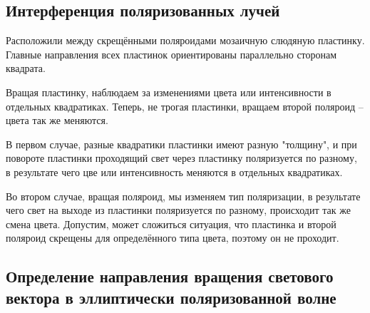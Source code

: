 \documentclass[a4paper,12pt]{article} %
\begin{document}
\subsection{Интерференция поляризованных лучей}

Расположили между скрещёнными поляроидами мозаичную слюдяную пластинку. Главные направления всех пластинок ориентированы параллельно сторонам квадрата.

Вращая пластинку, наблюдаем за изменениями цвета или интенсивности в отдельных квадратиках. Теперь, не трогая пластинки, вращаем второй поляроид -- цвета так же меняются. 

В первом случае, разные квадратики пластинки имеют разную "толщину", и при повороте пластинки проходящий свет через пластинку поляризуется по разному, в результате чего цве или интенсивность меняются в отдельных квадратиках. 

Во втором случае, вращая поляроид, мы изменяем тип поляризации, в результате чего свет на выходе из пластинки поляризуется по разному, происходит так же смена цвета. Допустим, может сложиться ситуация, что пластинка и второй поляроид скрещены для определённого типа цвета, поэтому он не проходит.

\subsection{Определение направления вращения светового вектора в эллиптически поляризованной волне}
\end{document}
